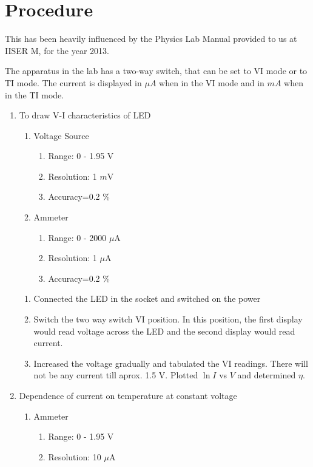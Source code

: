 \section{Procedure}
	This has been heavily influenced by the Physics Lab Manual provided to us at IISER M, for the year 2013.
	\par
	The apparatus in the lab has a two-way switch, that can be set to VI mode or to TI mode. The current is displayed in $\mu A$ when in the VI mode and in $mA$ when in the TI mode.
		\begin{enumerate}
			\item To draw V-I characteristics of LED
				\begin{enumerate}
					\item Voltage Source
						\begin{enumerate}
							\item Range: 0 - 1.95 V
							\item Resolution: 1 $m$V
							\item Accuracy=0.2 $\%$
						\end{enumerate}
					\item Ammeter
						\begin{enumerate}
							\item Range: 0 - 2000 $\mu$A
							\item Resolution: 1 $\mu$A
							\item Accuracy=0.2 $\%$
						\end{enumerate}
				\end{enumerate}
				\begin{enumerate}
					\item Connected the LED in the socket and switched on the power
					\item Switch the two way switch VI position. In this position, the first display would read voltage across the LED and the second display would read current.
					\item Increased the voltage gradually and tabulated the VI readings. There will not be any current till aprox. 1.5 V. Plotted $\ln I$ vs $V$ and determined $\eta$.
				\end{enumerate}
			\item Dependence of current on temperature at constant voltage
				\begin{enumerate}
					\item Ammeter
						\begin{enumerate}
							\item Range: 0 - 1.95 V
							\item Resolution: 10 $\mu$A

\end{enumerate}
\end{enumerate}
\end{enumerate}
